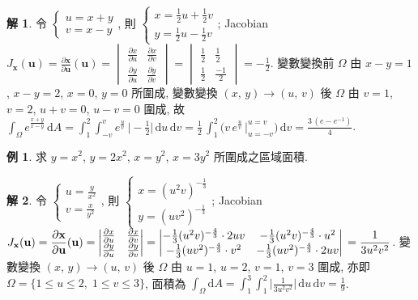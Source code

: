 \documentclass[12pt]{extarticle}
\newcommand{\ds}{\displaystyle}
\theoremstyle{definition}
\newtheorem*{ex}{例}
\newtheorem*{sol}{解}
\newcommand{\vu}{\mathbf{u}}
\newcommand{\vx}{\mathbf{x}}
\begin{document}
\begin{sol}
  令 $\ds\begin{cases}u = x + y \\ v = x - y\end{cases}\!\!\!\!\!$, 則 $\ds\begin{cases}x = \frac{1}{2}u + \frac{1}{2}v \\ y = \frac{1}{2}u - \frac{1}{2}v\end{cases}\!\!\!\!\!$; Jacobian $\ds J_{\vx}(\vu) = \frac{\partial\vx}{\partial\vu}(\vu) = \begin{vmatrix}\frac{\partial x}{\partial u} & \frac{\partial x}{\partial v} \\ \frac{\partial y}{\partial u}& \frac{\partial y}{\partial v}\end{vmatrix} = \begin{vmatrix}\frac{1}{2} & \frac{1}{2} \\ \frac{1}{2} & \frac{-1}{2}\end{vmatrix} = -\frac{1}{2}$. 變數變換前 $\Omega$ 由 $x - y = 1$, $x - y = 2$, $x = 0$, $y = 0$ 所圍成, 變數變換 $(x,\,y)\to(u,\,v)$ 後 $\Omega$ 由 $v = 1$, $v = 2$, $u + v = 0$, $u - v = 0$ 圍成, 故 $\ds\int_\Omega\!e^{\frac{x + y}{x - y}}\,\text{d}A = \int_1^2\!\int_{-v}^{v} e^{\frac{u}{v}}\,\Big|-\frac{1}{2}\Big|\,\text{d}u\,\text{d}v = \frac{1}{2}\,\int_1^2\!\Big(v\,e^{\frac{u}{v}}\,\Big|_{u = -v}^{u = v}\Big)\,\text{d}v = \frac{3\,(e - e^{-1})}{4}$.
\end{sol}

\begin{ex}
  求 $y = x^2$, $y = 2x^2$, $x = y^2$, $x = 3y^2$ 所圍成之區域面積. 
\end{ex}

\begin{sol}
  令 $\ds\begin{cases}u = \frac{y}{x^2} \\ v = \frac{x}{y^2}\end{cases}\!\!\!\!\!$, 則 $\ds\begin{cases}x = (u^2 v)^{-\frac{1}{3}} \\ y = (u v^2)^{-\frac{1}{3}} \end{cases}\!\!\!\!\!$; Jacobian $\ds J_{\vx}(\vu) = \frac{\partial\vx}{\partial\vu}(\vu) = \begin{vmatrix}\frac{\partial x}{\partial u} & \frac{\partial x}{\partial v} \\ \frac{\partial y}{\partial u}& \frac{\partial y}{\partial v}\end{vmatrix} = \begin{vmatrix}-\frac{1}{3}(u^2 v)^{-\frac{4}{3}}\cdot 2uv & -\frac{1}{3}(u^2 v)^{-\frac{4}{3}}\cdot u^2\\ -\frac{1}{3}(u v^2)^{-\frac{4}{3}}\cdot v^2 & -\frac{1}{3}(u v^2)^{-\frac{4}{3}}\cdot 2uv\end{vmatrix}\\ = \frac{1}{3u^2v^2}$. 變數變換 $(x,\,y)\to(u,\,v)$ 後 $\Omega$ 由 $u = 1$, $u = 2$, $v = 1$, $v = 3$ 圍成, 亦即 $\Omega = \{1\leqslant u\leqslant 2,\;1\leqslant v\leqslant 3\}$, 面積為 $\ds\int_\Omega\!\text{d}A = \int_1^3\!\int_1^2\bigg|\frac{1}{3u^2v^2}\bigg|\,\text{d}u\,\text{d}v = \frac{1}{9}$.
\end{sol}
\end{document}
